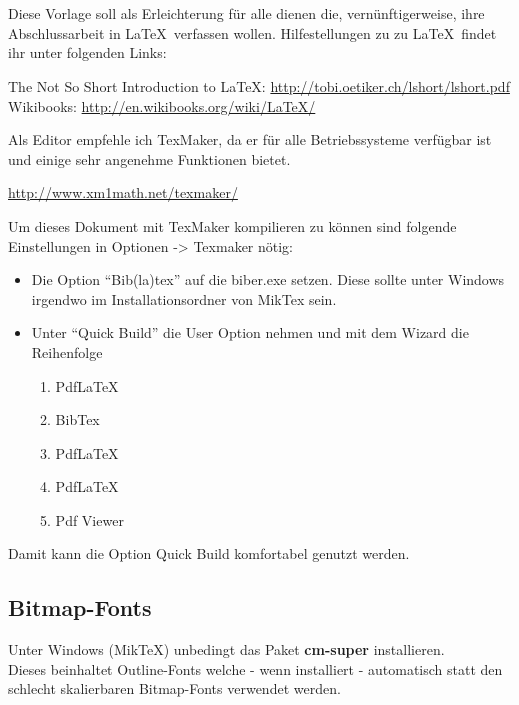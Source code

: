 \chapter*{\abstractname} %
Diese Vorlage soll als Erleichterung für alle dienen die, vernünftigerweise, ihre Abschlussarbeit in \LaTeX \ verfassen wollen. Hilfestellungen zu zu \LaTeX \ findet ihr unter folgenden Links:

\begin{center}
The Not So Short Introduction to \LaTeX: \url{http://tobi.oetiker.ch/lshort/lshort.pdf} \\
Wikibooks: \url{http://en.wikibooks.org/wiki/LaTeX/}
\end{center}

Als Editor empfehle ich TexMaker, da er für alle Betriebssysteme verfügbar ist und einige sehr angenehme Funktionen bietet.
\begin{center}\url{http://www.xm1math.net/texmaker/}\end{center}

Um dieses Dokument mit TexMaker kompilieren zu können sind folgende Einstellungen in Optionen -> Texmaker nötig:
\begin{itemize}
\item Die Option \enquote{Bib(la)tex} auf die biber.exe setzen. Diese sollte unter Windows irgendwo im Installationsordner von MikTex sein.
\item Unter \enquote{Quick Build} die User Option nehmen und mit dem Wizard die Reihenfolge
	\begin{enumerate}
	\item PdfLaTeX
	\item BibTex
	\item PdfLaTeX
	\item PdfLaTeX
	\item Pdf Viewer	
	\end{enumerate}
\end{itemize}
Damit kann die Option Quick Build komfortabel genutzt werden.
 	\tagmcend
\tagstructend
\section*{Bitmap-Fonts}
\noindent Unter Windows (MikTeX) unbedingt das Paket \textbf{cm-super} installieren.\\
Dieses beinhaltet Outline-Fonts welche - wenn installiert - automatisch statt den schlecht skalierbaren Bitmap-Fonts verwendet werden.
